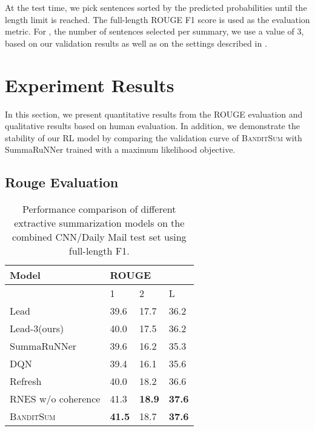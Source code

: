 \documentclass[11pt,a4paper]{article}
\newcommand{\B}{\textsc{BanditSum }}
\begin{document}
At the test time, we pick sentences sorted by the predicted probabilities until the length limit is reached. The full-length ROUGE F1 score is used as the evaluation metric. For , the number of sentences selected per summary, we use a value of 3, based on our validation results as well as on the settings described in \citet{ext5_summarunner}.

\section{Experiment Results\label{sec:results}}
In this section, we present  quantitative results from the ROUGE evaluation and qualitative results based on human evaluation. In addition, we demonstrate the stability of our RL model by comparing the validation curve of \B with SummaRuNNer \citep{ext5_summarunner} trained with a maximum likelihood objective. 
\subsection{Rouge Evaluation}




\begin{table}[!h]
\footnotesize
\centering
\begin{tabular}{|l|l|l|l|}
\hline
Model & \multicolumn{3}{l|}{ROUGE} \\ 
\hline
 & 1 & 2 & L \\ 
 \hline
Lead\citep{DBLP:Narayan/2018} & 39.6 & 17.7 & 36.2 \\ 
Lead-3(ours) & 40.0 & 17.5 & 36.2 \\
SummaRuNNer & 39.6 & 16.2 & 35.3  \\
DQN & 39.4	& 16.1 &	35.6 \\ 
Refresh & 40.0 &18.2 &36.6\\
RNES w/o coherence & 41.3 & \textbf{18.9} & \textbf{37.6}\\ 
\hline
\B  & \textbf{41.5} & 18.7 & \textbf{37.6} \\ 
\hline
\end{tabular}
\caption{Performance comparison of different extractive summarization models on the combined CNN/Daily Mail test set using full-length F1. }
\label{table:results_cnn}
\end{table}
\end{document}
